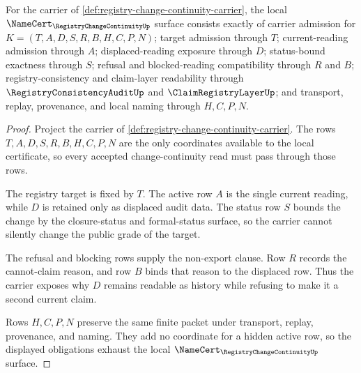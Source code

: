 \begin{theorem}
\label{thm:registry-change-continuity-obligations}
For the carrier of \autoref{def:registry-change-continuity-carrier}, the local $\NameCert_{\RegistryChangeContinuityUp}$ surface consists exactly of carrier admission for $K=(T,A,D,S,R,B,H,C,P,N)$; target admission through $T$; current-reading admission through $A$; displaced-reading exposure through $D$; status-bound exactness through $S$; refusal and blocked-reading compatibility through $R$ and $B$; registry-consistency and claim-layer readability through $\RegistryConsistencyAuditUp$ and $\ClaimRegistryLayerUp$; and transport, replay, provenance, and local naming through $H,C,P,N$.
\end{theorem}
\begin{proof}
Project the carrier of \autoref{def:registry-change-continuity-carrier}. The rows $T,A,D,S,R,B,H,C,P,N$ are the only coordinates available to the local certificate, so every accepted change-continuity read must pass through those rows.

The registry target is fixed by $T$. The active row $A$ is the single current reading, while $D$ is retained only as displaced audit data. The status row $S$ bounds the change by the closure-status and formal-status surface, so the carrier cannot silently change the public grade of the target.

The refusal and blocking rows supply the non-export clause. Row $R$ records the cannot-claim reason, and row $B$ binds that reason to the displaced row. Thus the carrier exposes why $D$ remains readable as history while refusing to make it a second current claim.

Rows $H,C,P,N$ preserve the same finite packet under transport, replay, provenance, and naming. They add no coordinate for a hidden active row, so the displayed obligations exhaust the local $\NameCert_{\RegistryChangeContinuityUp}$ surface.
\end{proof}

